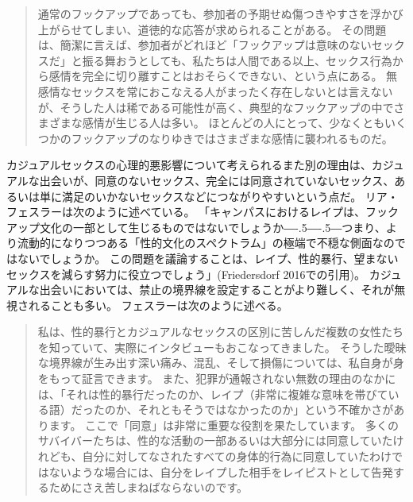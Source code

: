 \documentclass[paper=a4,book,openany]{jlreq}
\def\DDASH{―\kern-.5\zw―\kern-.5\zw―} %
\begin{document}
\begin{quote}
 通常のフックアップであっても、参加者の予期せぬ傷つきやすさを浮かび上がらせてしまい、道徳的な応答が求められることがある。
その問題は、簡潔に言えば、参加者がどれほど「フックアップは意味のないセックスだ」と振る舞おうとしても、私たちは人間である以上、セックス行為から感情を完全に切り離すことはおそらくできない、という点にある。
無感情なセックスを常におこなえる人がまったく存在しないとは言えないが、そうした人は稀である可能性が高く、典型的なフックアップの中でさまざまな感情が生じる人は多い。
ほとんどの人にとって、少なくともいくつかのフックアップのなりゆきではさまざまな感情に襲われるものだ。
\citep[Chapter 7]{rocha19}
\end{quote}

カジュアルセックスの心理的悪影響について考えられるまた別の理由は、カジュアルな出会いが、同意のないセックス、完全には同意されていないセックス、あるいは単に満足のいかないセックスなどにつながりやすいという点だ。
リア・フェスラーは次のように述べている。
「キャンパスにおけるレイプは、フックアップ文化の一部として生じるものではないでしょうか{\DDASH}つまり、より流動的になりつつある「性的文化のスペクトラム」の極端で不穏な側面なのではないでしょうか。
この問題を議論することは、レイプ、性的暴行、望まないセックスを減らす努力に役立つでしょう」(Friedersdorf 2016での引用)\nocite{friedersdorf16:_how_does_hook}。
カジュアルな出会いにおいては、禁止の境界線を設定することがより難しく、それが無視されることも多い。
フェスラーは次のように述べる。

\begin{quote}
 私は、性的暴行とカジュアルなセックスの区別に苦しんだ複数の女性たちを知っていて、実際にインタビューもおこなってきました。
そうした曖昧な境界線が生み出す深い痛み、混乱、そして損傷については、私自身が身をもって証言できます。
また、犯罪が通報されない無数の理由のなかには、「それは性的暴行だったのか、レイプ（非常に複雑な意味を帯びている語）だったのか、それともそうではなかったのか」という不確かさがあります。
ここで「同意」は非常に重要な役割を果たしています。
多くのサバイバーたちは、性的な活動の一部あるいは大部分には同意していたけれども、自分に対してなされたすべての身体的行為に同意していたわけではないような場合には、自分をレイプした相手をレイピストとして告発するためにさえ苦しまねばならないのです。
\citep{friedersdorf16:_how_does_hook}
\end{quote}
\end{document}
